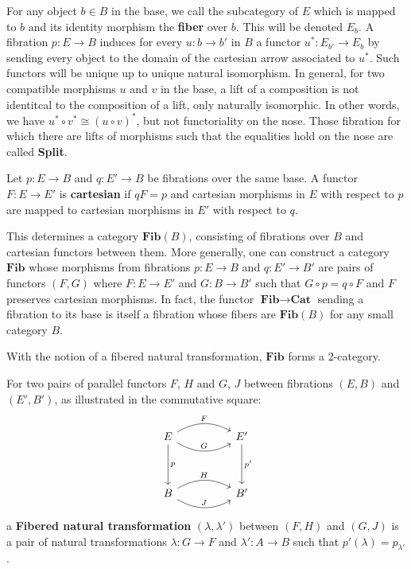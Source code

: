 For any object $b \in B$ in the base, we call the subcategory of $E$ which is mapped to $b$ and its identity morphism the \textbf{fiber} over $b$. This will be denoted $E_b$.
A fibration $p : E \to B$ induces for every $u : b \to b'$ in $B$ a functor $u^*: E_{b'} \to E_{b}$ by sending every object to the domain of the cartesian arrow associated to $u^*$. Such functors will be unique up to unique natural isomorphism. In general, for two compatible morphisms $u$ and $v$ in the base, a lift of a composition is not identitcal to the composition of a lift, only naturally isomorphic. In other words, we have $u^* \circ v^* \cong (u \circ v)^*$, but not functoriality on the nose. Those fibration for which there are lifts of morphisms such that the equalities hold on the nose are called \textbf{Split}.

\begin{defn}
Let $p : E \to B$ and $q : E' \to B$ be fibrations over the same base. A functor $F : E \to E'$ is \textbf{cartesian} if $qF = p$ and cartesian morphisms in $E$ with respect to $p$ are mapped to cartesian morphisms in $E'$ with respect to $q$.
\end{defn}
This determines a category $\textbf{Fib}(B)$, consisting of fibrations over $B$ and cartesian functors between them. More generally, one can construct a category $\textbf{Fib}$ whose morphisms from fibrations $p : E \to B$ and $q : E' \to B'$ are pairs of functors $(F, G)$ where $F : E \to E'$ and $G : B \to B'$ such that $G \circ p = q \circ F$ and $F$ preserves cartesian morphisms. In fact, the functor $\textbf{Fib} \to \textbf{Cat}$ sending a fibration to its base is itself a fibration whose fibers are $\textbf{Fib}(B)$ for any small category $B$.


With the notion of a fibered natural transformation, $\mathbf{Fib}$ forms a 2-category.
\begin{defn}
For two pairs of parallel functors $F$, $H$ and $G$, $J$ between fibrations $(E, B)$ and $(E', B')$, as illustrated in the commutative square:
\[
\ti
E \ar[d, "p"] \ar[r, "F", bend left] \ar[r, "G", bend right] & E' \ar[d, "{p'}"]\\
B \ar[r, "H", bend left] \ar[r, "J", bend right] & B'
\kz
\]
a \textbf{Fibered natural transformation} $(\lambda, \lambda')$ between $(F, H)$ and $(G, J)$ is a pair of natural transformations $\lambda : G \to F$ and $\lambda' : A \to B$ such that $p'(\lambda) = p_{\lambda'}$.
\end{defn}

